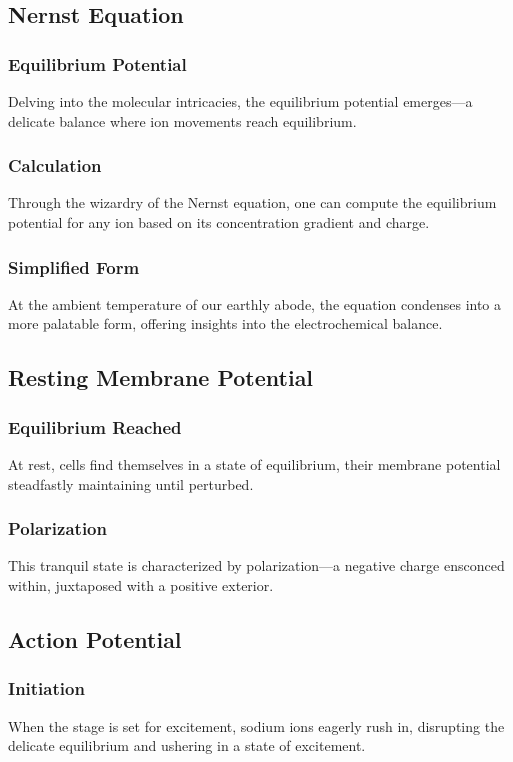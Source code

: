\documentclass{article}
\begin{document}
\subsection{Nernst Equation}

\subsubsection{Equilibrium Potential}
Delving into the molecular intricacies, the equilibrium potential emerges—a delicate balance where ion movements reach equilibrium.

\subsubsection{Calculation}
Through the wizardry of the Nernst equation, one can compute the equilibrium potential for any ion based on its concentration gradient and charge.

\subsubsection{Simplified Form}
At the ambient temperature of our earthly abode, the equation condenses into a more palatable form, offering insights into the electrochemical balance.

\subsection{Resting Membrane Potential}

\subsubsection{Equilibrium Reached}
At rest, cells find themselves in a state of equilibrium, their membrane potential steadfastly maintaining until perturbed.

\subsubsection{Polarization}
This tranquil state is characterized by polarization—a negative charge ensconced within, juxtaposed with a positive exterior.

\subsection{Action Potential}

\subsubsection{Initiation}
When the stage is set for excitement, sodium ions eagerly rush in, disrupting the delicate equilibrium and ushering in a state of excitement.
\end{document}
